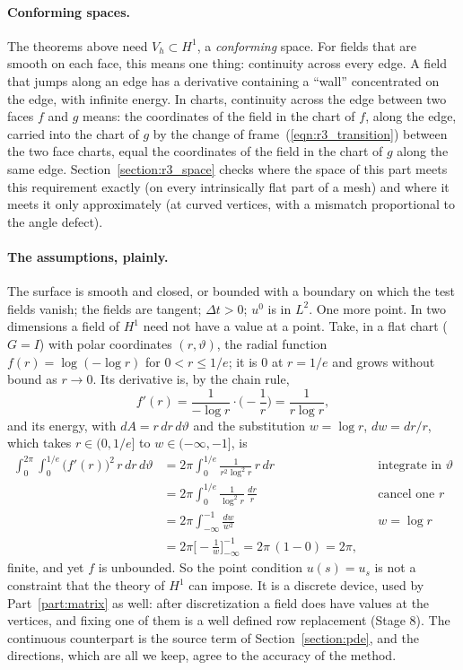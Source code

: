 \paragraph{Conforming spaces.} The theorems above need $V_h \subset H^1$, a \emph{conforming} space. For fields that are smooth on each face, this means one thing: continuity across every edge. A field that jumps along an edge has a derivative containing a ``wall'' concentrated on the edge, with infinite energy. In charts, continuity across the edge between two faces $f$ and $g$ means: the coordinates of the field in the chart of $f$, along the edge, carried into the chart of $g$ by the change of frame~(\ref{eqn:r3_transition}) between the two face charts, equal the coordinates of the field in the chart of $g$ along the same edge. Section~\ref{section:r3_space} checks where the space of this part meets this requirement exactly (on every intrinsically flat part of a mesh) and where it meets it only approximately (at curved vertices, with a mismatch proportional to the angle defect).

\paragraph{The assumptions, plainly.} The surface is smooth and closed, or bounded with a boundary on which the test fields vanish; the fields are tangent; $\Delta t > 0$; $u^0$ is in $L^2$. One more point. In two dimensions a field of $H^1$ need not have a value at a point. Take, in a flat chart ($G = I$) with polar coordinates $(r, \vartheta)$, the radial function $f(r) = \log(-\log r)$ for $0 < r \le 1/e$; it is $0$ at $r = 1/e$ and grows without bound as $r \to 0$. Its derivative is, by the chain rule,
\begin{equation*}
f'(r) = \frac{1}{-\log r}\cdot\Big(-\frac1r\Big) = \frac{1}{r\log r} ,
\end{equation*}
and its energy, with $dA = r\, dr\, d\vartheta$ and the substitution $w = \log r$, $dw = dr/r$, which takes $r \in (0, 1/e]$ to $w \in (-\infty, -1]$, is
\begin{align*}
\int_0^{2\pi}\!\!\int_0^{1/e} \big(f'(r)\big)^2\, r\, dr\, d\vartheta &= 2\pi\int_0^{1/e} \frac{1}{r^2\log^2 r}\, r\, dr && \text{integrate in } \vartheta \\
&= 2\pi\int_0^{1/e} \frac{1}{\log^2 r}\,\frac{dr}{r} && \text{cancel one } r \\
&= 2\pi\int_{-\infty}^{-1} \frac{dw}{w^2} && w = \log r \\
&= 2\pi\Big[-\frac1w\Big]_{-\infty}^{-1} = 2\pi\,(1 - 0) = 2\pi ,
\end{align*}
finite, and yet $f$ is unbounded. So the point condition $u(s) = u_s$ is not a constraint that the theory of $H^1$ can impose. It is a discrete device, used by Part~\ref{part:matrix} as well: after discretization a field does have values at the vertices, and fixing one of them is a well defined row replacement (Stage 8). The continuous counterpart is the source term of Section~\ref{section:pde}, and the directions, which are all we keep, agree to the accuracy of the method.

